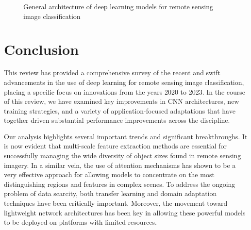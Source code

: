 \documentclass[12pt,a4paper]{article}
\begin{document}
\begin{figure}[htbp]
\centering
{}
\caption{General architecture of deep learning models for remote sensing image classification}
\label{fig:architecture}
\end{figure}

\section{Conclusion}
\label{sec:conclusion}

This review has provided a comprehensive survey of the recent and swift advancements in the use of deep learning for remote sensing image classification, placing a specific focus on innovations from the years 2020 to 2023. In the course of this review, we have examined key improvements in CNN architectures, new training strategies, and a variety of application-focused adaptations that have together driven substantial performance improvements across the discipline.

Our analysis highlights several important trends and significant breakthroughs. It is now evident that multi-scale feature extraction methods are essential for successfully managing the wide diversity of object sizes found in remote sensing imagery. In a similar vein, the use of attention mechanisms has shown to be a very effective approach for allowing models to concentrate on the most distinguishing regions and features in complex scenes. To address the ongoing problem of data scarcity, both transfer learning and domain adaptation techniques have been critically important. Moreover, the movement toward lightweight network architectures has been key in allowing these powerful models to be deployed on platforms with limited resources.
\end{document}
